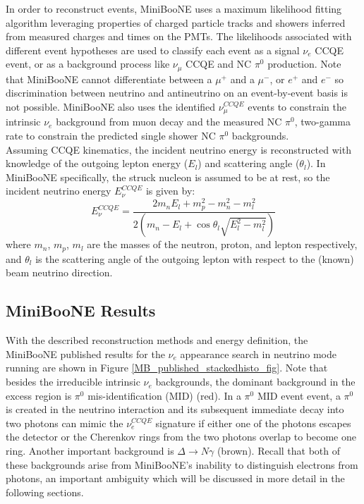In order to reconstruct events, MiniBooNE uses a maximum likelihood fitting algorithm leveraging properties of charged particle tracks and showers inferred from measured charges and times on the PMTs. The likelihoods associated with different event hypotheses are used to classify each event as a signal $\nu_e$ CCQE event, or as a background process like $\nu_\mu$ CCQE and NC $\pi^0$ production. Note that MiniBooNE cannot differentiate between a $\mu^+$ and a $\mu^-$, or $e^+$ and $e^-$ so discrimination between neutrino and antineutrino on an event-by-event basis is not possible. MiniBooNE also uses the identified $\nu_\mu^{CCQE}$ events to constrain the intrinsic $\nu_e$ background from muon decay and the measured NC $\pi^0$, two-gamma rate to constrain the predicted single shower NC $\pi^0$ backgrounds.\\

Assuming CCQE kinematics, the incident neutrino energy is reconstructed with knowledge of the outgoing lepton energy ($E_l$) and scattering angle ($\theta_l$). In MiniBooNE specifically, the struck nucleon is assumed to be at rest, so the incident neutrino energy $E_\nu^{CCQE}$ is given by:
\begin{equation}\label{MB_CCQE_formula}
E_\nu^{CCQE} = \frac{2m_nE_l+m_p^2-m_n^2-m_l^2}{2(m_n-E_l+\cos\theta_l\sqrt{E_l^2-m_l^2})}
\end{equation}
where $m_n$, $m_p$, $m_l$ are the masses of the neutron, proton, and lepton respectively, and $\theta_l$ is the scattering angle of the outgoing lepton with respect to the (known) beam neutrino direction.\\

\subsection{MiniBooNE Results}
With the described reconstruction methods and energy definition, the MiniBooNE published results \cite{MBLEEPaper} for the $\nu_e$ appearance search in neutrino mode running are shown in Figure \ref{MB_published_stackedhisto_fig}. Note that besides the irreducible intrinsic $\nu_e$ backgrounds, the dominant background in the excess region is $\pi^0$ mis-identification (MID) (red). In a $\pi^0$ MID event event, a $\pi^0$ is created in the neutrino interaction and its subsequent immediate decay into two photons can mimic the $\nu_e^{CCQE}$ signature if either one of the photons escapes the detector or the Cherenkov rings from the two photons overlap to become one ring. Another important background is $\Delta\rightarrow N\gamma$ (brown). Recall that both of these backgrounds arise from MiniBooNE's inability to distinguish electrons from photons, an important ambiguity which will be discussed in more detail in the following sections.\\


